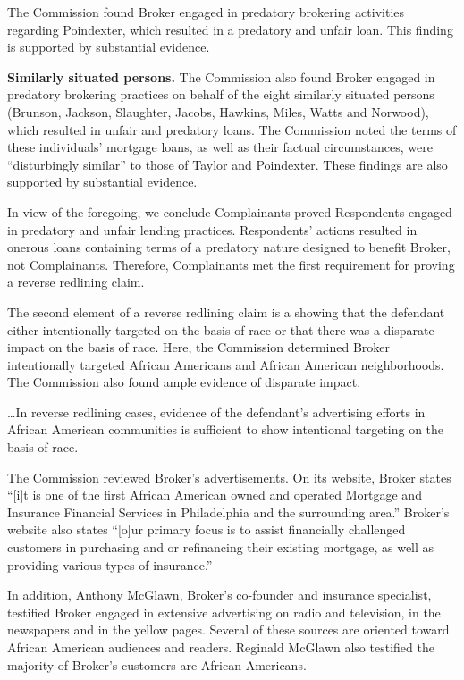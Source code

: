 The Commission found Broker engaged in predatory brokering activities regarding
Poindexter, which resulted in a predatory and unfair loan. This finding is
supported by substantial evidence.

\textbf{Similarly situated persons.} The Commission also found Broker engaged in
predatory brokering practices on behalf of the eight similarly situated persons
(Brunson, Jackson, Slaughter, Jacobs, Hawkins, Miles, Watts and Norwood), which
resulted in unfair and predatory loans. The Commission noted the terms of these
individuals' mortgage loans, as well as their factual circumstances, were
``disturbingly similar'' to those of Taylor and Poindexter. These findings are
also supported by substantial evidence.

In view of the foregoing, we conclude Complainants proved Respondents engaged in
predatory and unfair lending practices. Respondents' actions resulted in
onerous loans containing terms of a predatory nature designed to benefit
Broker, not Complainants. Therefore, Complainants met the first requirement for
proving a reverse redlining claim. 


The second element of a reverse redlining claim is a showing that the defendant
either intentionally targeted on the basis of race or that there was a
disparate impact on the basis of race. Here, the Commission determined Broker
intentionally targeted African Americans and African American neighborhoods.
The Commission also found ample evidence of disparate impact.

\dots In reverse redlining cases, evidence of the defendant's advertising
efforts in African American communities is sufficient to show intentional
targeting on the basis of race. 

The Commission reviewed Broker's advertisements. On its website, Broker states
``[i]t is one of the first African American owned and operated Mortgage and
Insurance Financial Services in Philadelphia and the surrounding area.''
Broker's website also states ``[o]ur primary focus is to assist financially
challenged customers in purchasing and or refinancing their existing mortgage,
as well as providing various types of insurance.'' 

In addition, Anthony McGlawn, Broker's co-founder and insurance specialist,
testified Broker engaged in extensive advertising on radio and television, in
the newspapers and in the yellow pages. Several of these sources are oriented
toward African American audiences and readers. Reginald McGlawn also testified
the majority of Broker's customers are African Americans. 

